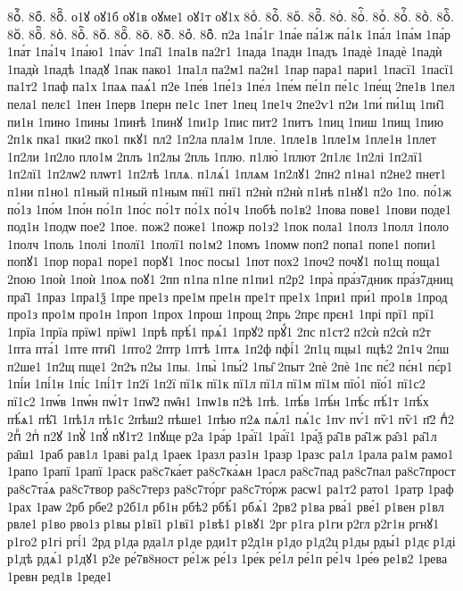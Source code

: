 {8оⷾ҇.
8оⷿ.
8оⷿ҇.
о1ꙋ
оꙋ1б
оꙋ1в
оꙋме1
оꙋ1т
оꙋ1х
8оꙴ.
8оꙴ҇.
8оꙵ.
8оꙵ҇.
8оꙶ.
8оꙶ҇.
8оꙷ.
8оꙷ҇.
8оꙸ.
8оꙸ҇.
8оꙹ.
8оꙹ҇.
8оꙺ.
8оꙺ҇.
8оꙻ.
8оꙻ҇.
8о꙼.
8о꙼҇.
8о꙽.
8о꙽҇.
п2а
1па́1г
1па́е
па́1ж
па́1к
1па́л
1па́м
1па́р
1па́т
1па́1ч
1па́ю1
1па́ѵ
1па̑1
1па1в
па2г1
1пада
1падн
1падъ
1падѐ
1падѐ
1падѝ
1падѝ
1падѣ
1падꙋ
1пак
пако1
1па1л
па2м1
па2н1
1пар
пара1
пари1
1пасї1
1пасї1
па1т2
1паф
па1х
1паѧ
паѧ́1
п2е
1пе́в
1пе́1з
1пе́л
1пе́м
пе́1п
пе́1с
1пе́щ
2пе1в
1пел
пела1
пелє1
1пен
1перв
1перн
пе1с
1пет
1пец
1пе1ч
2пе2ѵ1
п2и
1пи́
пи́1щ
1пи̑1
пи1н
1пино
1пины
1пинѣ
1пинꙋ
1пи1р
1пис
пит2
1питъ
1пиц
1пиш
1пищ
1пию
2п1к
пка1
пки2
пко1
пкꙋ1
пл2
1п2ла
пла1м
1пле.
1пле1в
1пле1м
1пле1н
1плет
1п2ли
1п2ло
пло1м
2плъ
1п2лы
2пль
1плю.
п1лю̀
1плют
2п1лє
1п2лі
1п2лї1
1п2лї1
1п2лѡ2
плѡт1
1п2лѣ
1плѧ.
п1лѧ́1
1плѧм
1п2лꙋ1
2пн2
п1на1
п2не2
пнет1
п1ни
п1но1
п1ный
п1ный
п1ным
пнї1
пнї1
п2нѝ
п2нѝ
п1нѣ
п1нꙋ1
п2о
1по.
по́1ж
по́1з
1по́м
1по́н
по́1п
1по́с
по́1т
по́1х
по́1ч
1побѣ
по1в2
1пова
пове1
1пови
поде1
под1н
1подѡ
пое2
1пое.
пож2
поже1
1пожр
по1з2
1пок
пола1
1полз
1полл
1поло
1полч
1поль
1полі
1полї1
1полї1
по1м2
1помъ
1помѡ
поп2
попа1
попе1
попи1
попꙋ1
1пор
пора1
поре1
порꙋ1
1пос
посы1
1пот
пох2
1поч2
почꙋ1
по1щ
поща1
2пою
1поѝ
1поѝ
1поѧ
поꙋ1
2пп
п1па
п1пе
п1пи1
п2р2
1пра̀
пра́з7дник
пра́з7дниц
пра̑1
1праз
1пра1ѯ
1пре
пре1з
пре1м
пре1н
пре1т
пре1х
1при1
при́1
про1в
1прод
про1з
про1м
про1н
1проп
1прох
1прош
1прощ
2прь
2прє
прєн1
1прі
прї1
прї1
1прїа
1прїа
прїѡ1
прїѡ1
1прѣ
прѣ́1
прѧ́1
1прꙋ2
прꙋ́1
2пс
п1ст2
п2сѝ
п2сѝ
п2т
1пта
пта́1
1пте
пти̑1
1пто2
2птр
1птѣ
1птѧ
1п2ф
пфі́1
2п1ц
пцы1
пцѣ2
2п1ч
2пш
п2ше1
1п2щ
пще1
2п2ъ
п2ы
1пы.
1пы̀
1пы́2
1пы̑
2пыт
2пѐ
2пѐ
1пє
пє́2
пє́н1
пє́р1
1пі́и
1пі́1н
1пі́с
1пі́1т
1п2ї
1п2ї
пї1к
пї1к
пї1л
пї1л
пї1м
пї1м
пїо́1
пїо́1
пї1с2
пї1с2
1пѡ́в
1пѡ́н
пѡ́1т
1пѡ̑2
пѡ̑н1
1пѡ1в
п2ѣ
1пѣ.
1пѣ́в
1пѣ́н
1пѣ́с
пѣ́1т
1пѣ́х
пѣ́ѧ1
пѣ̑1
1пѣ1л
пѣ1с
2пѣш2
пѣше1
1пѣю
п2ѧ
пѧ́л1
пѧ́1с
1пѵ
пѵ́1
пѷ1
пѷ1
п҃2
пⷣ2
2пⷬ
2пⷭ
п2ꙋ
1пꙋ̀
1пꙋ́
пꙋ1т2
1пꙋще
р2а
1ра́р
1ра́ї1
1ра́ї1
1ра́ѯ
ра̑1в
ра̑1ж
ра̑з1
ра̑1л
ра̑ш1
1раб
рав1л
1раві
ра1д
1раек
1разл
раз1н
1разр
1разс
ра1л
1рала
ра1м
рамо1
1рапо
1рапї
1рапї
1раск
ра8с7ка́ет
ра8с7ка́ѧн
1расл
ра8с7пад
ра8с7пал
ра8с7прост
ра8с7та́ѧ
ра8с7твор
ра8с7терз
ра8с7то́рг
ра8с7то́рж
расѡ1
ра1т2
рато1
1ратр
1раф
1рах
1раѡ
2рб
рбе2
р2б1л
рб1н
рбѣ2
рбѣ́1
рбѧ́1
2рв2
р1ва
рва́1
рве́1
р1вен
р1вл
рвле1
р1во
рво1з
р1вы
р1вї1
р1вї1
р1вѣ1
р1вꙋ1
2рг
р1га
р1ги
р2гл
р2г1н
ргнꙋ1
р1го2
р1гі
ргі́1
2рд
р1да
рда1л
р1де
рди1т
р2д1н
р1до
р1д2ц
р1ды
рды́1
р1дє
р1ді
р1дѣ
рдѧ́1
р1дꙋ1
р2е
ре́7в8ност
ре́1ж
ре́1з
1ре́к
ре́1л
ре́1п
ре́1ч
1ре́ѳ
ре1в2
1рева
1ревн
ред1в
1реде1
}
